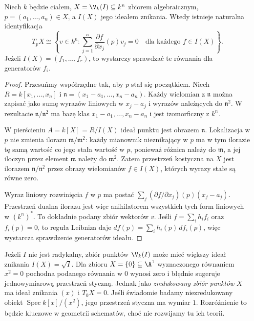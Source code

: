 \begin{twierdzenie}
\label{tw:zariski-tangent-formula}
Niech $k$ będzie ciałem, $X=\V_k(I)\subseteq k^n$
zbiorem algebraicznym, $p=(a_1,\dots,a_n)\in X$,
a $I(X)$ jego ideałem znikania. Wtedy istnieje
naturalna identyfikacja
\[
 T_pX\cong\left\{v\in k^n:
 \sum_{j=1}^n\frac{\partial f}{\partial x_j}(p)v_j=0
 \quad\text{dla każdego }f\in I(X)\right\}.
\]
Jeżeli $I(X)=(f_1,\dots,f_r)$, to wystarczy sprawdzać
te równania dla generatorów $f_i$.
\end{twierdzenie}
\begin{proof}
Przesuńmy współrzędne tak, aby $p$ stał się początkiem.
Niech $R=k[x_1,\dots,x_n]$ i
$\mathfrak n=(x_1-a_1,\dots,x_n-a_n)$.
Każdy wielomian z $\mathfrak n$ można zapisać jako
sumę wyrazów liniowych w $x_j-a_j$ i wyrazów należących
do $\mathfrak n^2$. W rezultacie
$\mathfrak n/\mathfrak n^2$ ma bazę klas
$x_1-a_1,\dots,x_n-a_n$ i jest izomorficzny z $k^n$.

W pierścieniu $A=k[X]=R/I(X)$ ideał punktu jest obrazem
$\mathfrak n$. Lokalizacja w $p$ nie zmienia ilorazu
$\mathfrak m/\mathfrak m^2$: każdy mianownik nieznikający
w $p$ ma w tym ilorazie tę samą wartość co jego stała
wartość w $p$, ponieważ różnica należy do $\mathfrak m$,
a jej iloczyn przez element $\mathfrak m$ należy do
$\mathfrak m^2$. Zatem przestrzeń kostyczna na $X$
jest ilorazem $\mathfrak n/\mathfrak n^2$ przez obrazy
wielomianów $f\in I(X)$, których wyrazy stałe są równe zero.

Wyraz liniowy rozwinięcia $f$ w $p$ ma postać
$\sum_j(\partial f/\partial x_j)(p)(x_j-a_j)$.
Przestrzeń dualna ilorazu jest więc anihilatorem
wszystkich tych form liniowych w $(k^n)^*$.
To dokładnie podany zbiór wektorów $v$.
Jeśli $f=\sum_i h_if_i$ oraz $f_i(p)=0$, to
reguła Leibniza daje
$df(p)=\sum_i h_i(p)\,df_i(p)$, więc wystarcza
sprawdzenie generatorów ideału.
\end{proof}

\begin{uwaga}
Jeżeli $I$ nie jest radykalny, zbiór punktów $\V_k(I)$
może mieć większy ideał znikania $I(X)=\sqrt I$.
Dla zbioru $X=\{0\}\subseteq\A^1$ wyznaczonego
równaniem $x^2=0$ pochodna podanego równania w $0$
wynosi zero i błędnie sugeruje jednowymiarową przestrzeń
styczną. Jednak jako \emph{zredukowany zbiór punktów}
$X$ ma ideał znikania $(x)$ i $T_0X=0$.
Jeśli świadomie badamy niezredukowany obiekt
$\operatorname{Spec}k[x]/(x^2)$, jego przestrzeń
styczna ma wymiar $1$. Rozróżnienie to będzie kluczowe
w geometrii schematów, choć nie rozwijamy tu ich teorii.
\end{uwaga}

